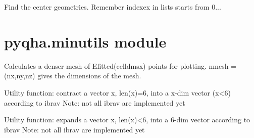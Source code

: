 \documentclass[letterpaper,10pt,english]{sphinxmanual}
\begin{document}

\begin{fulllineitems}
\label{pyqha:pyqha.gruneisen1D.find_geocenters}
Find the center geometries. Remember indexex in lists starts from 0...

\end{fulllineitems}



\section{pyqha.minutils module}
\label{pyqha:module-pyqha.minutils}\label{pyqha:pyqha-minutils-module}

\begin{fulllineitems}
\label{pyqha:pyqha.minutils.calculate_fitted_points_anis}
Calculates a denser mesh of Efitted(celldmsx) points for plotting. nmesh = (nx,ny,nz)
gives the dimensions of the mesh.

\end{fulllineitems}


\begin{fulllineitems}
\label{pyqha:pyqha.minutils.contract_vector}
Utility function: contract a vector x, len(x)=6, into a x-dim vector (x\textless{}6) 
according to ibrav
Note: not all ibrav are implemented yet

\end{fulllineitems}


\begin{fulllineitems}
\label{pyqha:pyqha.minutils.expand_vector}
Utility function: expands a vector x, len(x)\textless{}6, into a 6-dim vector according
to ibrav
Note: not all ibrav are implemented yet

\end{fulllineitems}
\end{document}
